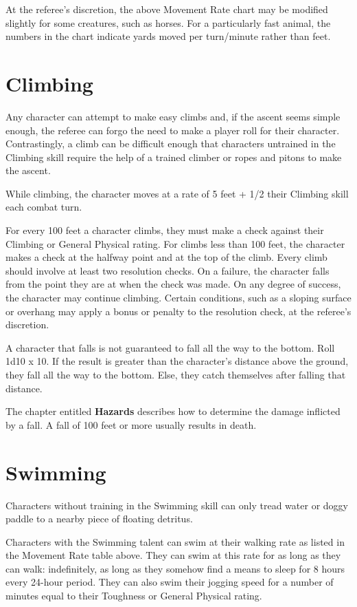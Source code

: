 \documentclass[oneside]{book}
\begin{document}
\begin{multicols}{2}
At the referee's discretion, the above Movement Rate chart may be modified slightly for some creatures, such as horses. For a particularly fast animal, the numbers in the chart indicate yards moved per turn/minute rather than feet. 

\section{Climbing}
Any character can attempt to make easy climbs and, if the ascent seems simple enough, the referee can forgo the need to make a player roll for their character. Contrastingly, a climb can be difficult enough that characters untrained in the Climbing skill require the help of a trained climber or ropes and pitons to make the ascent. 

While climbing, the character moves at a rate of 5 feet + 1/2 their Climbing skill each combat turn. 

For every 100 feet a character climbs, they must make a check against their Climbing or General Physical rating. For climbs less than 100 feet, the character makes a check at the halfway point and at the top of the climb. Every climb should involve at least two resolution checks. On a failure, the character falls from the point they are at when the check was made. On any degree of success, the character may continue climbing. Certain conditions, such as a sloping surface or overhang may apply a bonus or penalty to the resolution check, at the referee's discretion.

A character that falls is not guaranteed to fall all the way to the bottom. Roll 1d10 x 10. If the result is greater than the character's distance above the ground, they fall all the way to the bottom. Else, they catch themselves after falling that distance. 

The chapter entitled \textbf{Hazards} describes how to determine the damage inflicted by a fall. A fall of 100 feet or more usually results in death. 

\section{Swimming}
Characters without training in the Swimming skill can only tread water or doggy paddle to a nearby piece of floating detritus. 

Characters with the Swimming talent can swim at their walking rate as listed in the Movement Rate table above. They can swim at this rate for as long as they can walk: indefinitely, as long as they somehow find a means to sleep for 8 hours every 24-hour period. They can also swim their jogging speed for a number of minutes equal to their Toughness or General Physical rating. 


\end{multicols}
\end{document}
